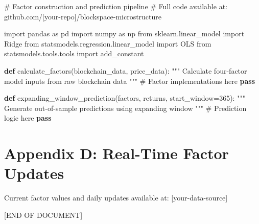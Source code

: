 \documentclass[
  12pt,
  letterpaper,
  DIV=11,
  numbers=noendperiod]{scrartcl}
\newenvironment{Shaded}{\begin{snugshade}}{\end{snugshade}}
\newcommand{\CommentTok}[1]{\textcolor[rgb]{0.37,0.37,0.37}{#1}}
\newcommand{\ControlFlowTok}[1]{\textcolor[rgb]{0.00,0.23,0.31}{\textbf{#1}}}
\newcommand{\DecValTok}[1]{\textcolor[rgb]{0.68,0.00,0.00}{#1}}
\newcommand{\ImportTok}[1]{\textcolor[rgb]{0.00,0.46,0.62}{#1}}
\newcommand{\KeywordTok}[1]{\textcolor[rgb]{0.00,0.23,0.31}{\textbf{#1}}}
\newcommand{\NormalTok}[1]{\textcolor[rgb]{0.00,0.23,0.31}{#1}}
\newcommand{\OperatorTok}[1]{\textcolor[rgb]{0.37,0.37,0.37}{#1}}
\begin{document}
\begin{Shaded}
\begin{Highlighting}[]
\CommentTok{\# Factor construction and prediction pipeline}
\CommentTok{\# Full code available at: github.com/[your{-}repo]/blockspace{-}microstructure}

\ImportTok{import}\NormalTok{ pandas }\ImportTok{as}\NormalTok{ pd}
\ImportTok{import}\NormalTok{ numpy }\ImportTok{as}\NormalTok{ np}
\ImportTok{from}\NormalTok{ sklearn.linear\_model }\ImportTok{import}\NormalTok{ Ridge}
\ImportTok{from}\NormalTok{ statsmodels.regression.linear\_model }\ImportTok{import}\NormalTok{ OLS}
\ImportTok{from}\NormalTok{ statsmodels.tools.tools }\ImportTok{import}\NormalTok{ add\_constant}

\KeywordTok{def}\NormalTok{ calculate\_factors(blockchain\_data, price\_data):}
    \CommentTok{"""}
\CommentTok{    Calculate four{-}factor model inputs from raw blockchain data}
\CommentTok{    """}
    \CommentTok{\# Factor implementations here}
    \ControlFlowTok{pass}

\KeywordTok{def}\NormalTok{ expanding\_window\_prediction(factors, returns, start\_window}\OperatorTok{=}\DecValTok{365}\NormalTok{):}
    \CommentTok{"""}
\CommentTok{    Generate out{-}of{-}sample predictions using expanding window}
\CommentTok{    """}
    \CommentTok{\# Prediction logic here}
    \ControlFlowTok{pass}
\end{Highlighting}
\end{Shaded}

\section{Appendix D: Real-Time Factor
Updates}\label{appendix-d-real-time-factor-updates}

Current factor values and daily updates available at:
{[}your-data-source{]}

{[}END OF DOCUMENT{]}
\end{document}
